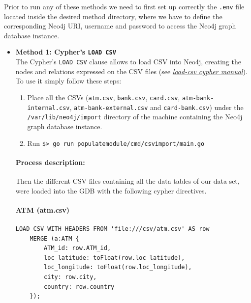 

Prior to run any of these methods we need to first set up correctly the \texttt{.env} file located inside the desired method directory, where we have to define the corresponding Neo4j URI, username and password to access the Neo4j graph database instance.

\begin{itemize}
\item{\textbf{Method 1: Cypher's \texttt{LOAD CSV}}\\}
The Cypher's \texttt{LOAD CSV} clause allows to load CSV into Neo4j, creating the nodes and relations expressed on the CSV files (see \href{https://neo4j.com/docs/cypher-manual/5/clauses/load-csv/}{\textit{load-csv cypher manual}}). 
To use it simply follow these steps:
\begin{enumerate}
    \item Place all the CSVs (\texttt{atm.csv}, \texttt{bank.csv}, \texttt{card.csv}, \texttt{atm-bank-internal.csv}, \texttt{atm-bank-external.csv} 
    and \texttt{card-bank.csv}) under the \texttt{/var/lib/neo4j/import} directory
    of the machine containing the Neo4j graph database instance.
    \item Run \texttt{\$> go run populatemodule/cmd/csvimport/main.go}
\end{enumerate}

\paragraph{Process description:}

Then the different CSV files containing all the data tables of our data set, were loaded into the GDB with the following cypher directives.


\paragraph{ATM (atm.csv)}

\begin{center}
\lstset{style=cypherStyle}
\begin{lstlisting}[caption={atm.csv}]
    LOAD CSV WITH HEADERS FROM 'file:///csv/atm.csv' AS row
    MERGE (a:ATM {
        ATM_id: row.ATM_id,
        loc_latitude: toFloat(row.loc_latitude),
        loc_longitude: toFloat(row.loc_longitude),
        city: row.city,
        country: row.country
    });
\end{lstlisting}
\end{center}


\end{itemize}
